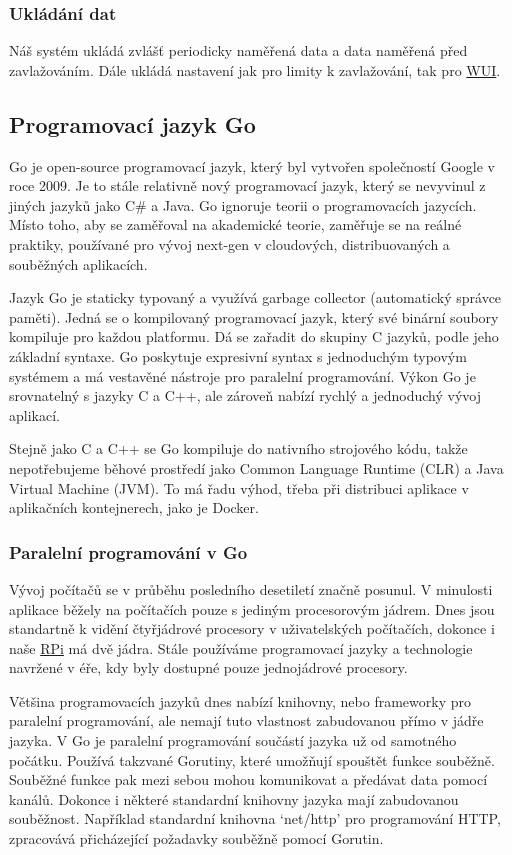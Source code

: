 \documentclass[czech,12pt,a4paper]{article}
\begin{document}
\subsubsection{Ukládání dat}

Náš systém ukládá zvlášť periodicky naměřená data a data naměřená před zavlažováním. Dále ukládá nastavení jak pro limity k zavlažování, tak pro \underline{\ac{WUI}}.

\subsection{Programovací jazyk Go}

Go je open-source programovací jazyk, který byl vytvořen společností Google v roce 2009. Je to stále relativně nový programovací jazyk, který se nevyvinul z jiných jazyků jako C\# a Java. Go ignoruje teorii o programovacích jazycích. Místo toho, aby se zaměřoval na akademické teorie, zaměřuje se na reálné praktiky, používané pro vývoj next-gen v cloudových, distribuovaných a souběžných aplikacích.

Jazyk Go je staticky typovaný a využívá garbage collector (automatický správce paměti). Jedná se o kompilovaný programovací jazyk, který své binární soubory kompiluje pro každou platformu. Dá se zařadit do skupiny C jazyků, podle jeho základní syntaxe. Go poskytuje expresivní syntax s jednoduchým typovým systémem a má vestavěné nástroje pro paralelní programování. Výkon Go je srovnatelný s jazyky C a C++, ale zároveň nabízí rychlý a jednoduchý vývoj aplikací.

Stejně jako C a C++ se Go kompiluje do nativního strojového kódu, takže
nepotřebujeme běhové prostředí jako Common Language Runtime (CLR) a Java Virtual Machine (JVM). To má řadu výhod, třeba při distribuci aplikace v aplikačních kontejnerech, jako je Docker.

\subsubsection{Paralelní programování v Go}

Vývoj počítačů se v průběhu posledního desetiletí značně posunul. V minulosti aplikace běžely na počítačích pouze s jediným procesorovým jádrem. Dnes jsou standartně k vidění čtyřjádrové procesory v uživatelských počítačích, dokonce i naše \underline{\ac{RPi}} má dvě jádra. Stále používáme programovací jazyky a technologie navržené v éře, kdy byly dostupné pouze jednojádrové procesory.

Většina programovacích jazyků dnes nabízí knihovny, nebo frameworky pro \linebreak paralelní programování, ale nemají tuto vlastnost zabudovanou přímo v jádře jazyka. V Go je paralelní programování součástí jazyka už od samotného počátku. Používá takzvané Gorutiny, které umožňují spouštět funkce souběžně. Souběžné funkce pak mezi sebou mohou komunikovat a předávat data pomocí kanálů. Dokonce i některé standardní knihovny jazyka mají zabudovanou souběžnost. Například standardní knihovna `net/http' pro programování HTTP, zpracovává přicházející požadavky souběžně pomocí Gorutin.
\end{document}
